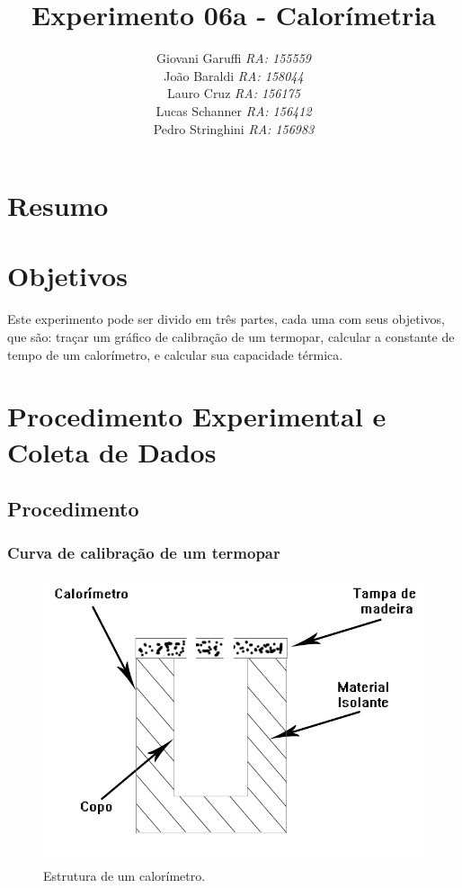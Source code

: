 \documentclass[12pt,a4paper]{article}
\begin{document}
\title{\vspace{70mm}\Huge Experimento 06a - Calorímetria}
\author{ Giovani Garuffi\qquad\hfill
		\textit {RA: 155559}\protect\\
		João Baraldi\hfill
		\textit{RA: 158044}\protect\\
		Lauro Cruz\hfill
		\textit{RA: 156175}\protect\\
		Lucas Schanner\hfill
		\textit{RA: 156412}\protect\\
		Pedro Stringhini\hfill
		\textit {RA: 156983}								
		}
\maketitle
\newpage
\section{Resumo}


\section{Objetivos}
Este experimento pode ser divido em três partes, cada uma com seus objetivos, que são: traçar um gráfico de calibração de um termopar, calcular a constante de tempo de um calorímetro, e calcular sua capacidade térmica.


\section{Procedimento Experimental e Coleta de Dados}


\subsection{Procedimento}


\subsubsection{Curva de calibração de um termopar}



\begin{figure}[!htbp]
\centering
\includegraphics[scale=0.3]{Fig6a1.jpg}
\caption{Estrutura de um calorímetro.}
\label{calorimetro}
\end{figure}
\end{document}
